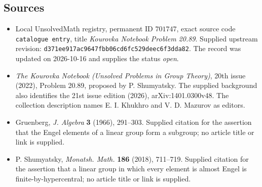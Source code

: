 \documentclass[11pt]{article}
\begin{document}
\subsection{Sources}
\begin{itemize}
\item Local UnsolvedMath registry, permanent ID \(701747\), exact source code \texttt{catalogue entry}, title \emph{Kourovka Notebook Problem 20.89}. Supplied upstream revision: \texttt{d371ee917ac9647fbb06cd6fc529deec6f3dda82}. The record was updated on 2026-10-16 and supplies the status \emph{open}.
\item \emph{The Kourovka Notebook (Unsolved Problems in Group Theory)}, 20th issue (2022), Problem 20.89, proposed by P. Shumyatsky. The supplied background also identifies the 21st issue edition (2026), arXiv:1401.0300v48. The collection description names E. I. Khukhro and V. D. Mazurov as editors.
\item Gruenberg, \emph{J. Algebra} \textbf{3} (1966), 291--303. Supplied citation for the assertion that the Engel elements of a linear group form a subgroup; no article title or link is supplied.
\item P. Shumyatsky, \emph{Monatsh. Math.} \textbf{186} (2018), 711--719. Supplied citation for the assertion that a linear group in which every element is almost Engel is finite-by-hypercentral; no article title or link is supplied.
\end{itemize}
\end{document}
